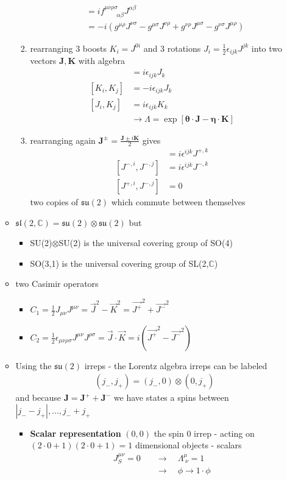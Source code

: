 \documentclass[10pt,a4paper]{report}
\theoremstyle{definition}
\begin{document}
\begin{itemize}
\begin{itemize}
\begin{enumerate}
\begin{align}
&=if^{\mu\nu\rho\sigma}_{\qquad\alpha\beta}J^{\alpha\beta}\\
&=-i(g^{\mu\rho}J^{\nu\sigma}-g^{\mu\sigma}J^{\nu\rho}+g^{\nu\rho}J^{\mu\sigma}-g^{\nu\sigma}J^{\mu\rho})
\end{align}
\item rearranging 3 boosts $K_i=J^{0i}$ and 3 rotations $J_i=\frac{1}{2}\epsilon_{ijk}J^{jk}$ into two vectors $\mathbf{J,K}$ with algebra
\begin{align}
[J_i,J_j]&=i\epsilon_{ijk}J_k\\
[K_i,K_j]&=-i\epsilon_{ijk}J_k\\
[J_i,K_j]&=i\epsilon_{ijk}K_k\\
&\rightarrow\Lambda=\exp\left[\pmb{\theta}\cdot\mathbf{J}-\pmb{\eta}\cdot\mathbf{K}\right]
\end{align}
\item rearranging again $\mathbf{J}^\pm=\frac{\mathbf{J}\pm i\mathbf{K}}{2}$ gives
\begin{align}
[J^{+,i},J^{+,j}]&=i\epsilon^{ijk}J^{+,k}\\
[J^{-,i},J^{-,j}]&=i\epsilon^{ijk}J^{-,k}\\
[J^{+,i},J^{-,j}]&=0
\end{align}
two copies of $\mathfrak{su}(2)$ which commute between themselves
\end{enumerate}
\item $\mathfrak{sl}(2,\mathbb{C})=\mathfrak{su}(2)\otimes\mathfrak{su}(2)$ but 
\begin{itemize}
\item SU(2)$\otimes$SU(2) is the universal covering group of SO(4)
\item SO(3,1) is the universal covering group of SL(2,$\mathbb{C}$)
\end{itemize}
\item two Casimir operators
\begin{itemize}
\item $C_1=\frac{1}{2}J_{\mu\nu}J^{\mu\nu}=\vec{J}^2-\vec{K}^2=\vec{J^+}^2+\vec{J^-}^2$
\item $C_2=\frac{1}{2}\epsilon_{\mu\nu\rho\sigma}J^{\mu\nu}J^{\rho\sigma}=\vec{J}\cdot\vec{K}=i(\vec{J^+}^2-\vec{J^-}^2)$
\end{itemize} 
\item Using the $\mathfrak{su}(2)$ irreps - the Lorentz algebra irreps can be labeled 
\begin{align}
(j_-,j_+)=(j_-,0)\otimes(0,j_+)
\end{align}
and because $\mathbf{J}=\mathbf{J}^+ + \mathbf{J}^-$ we have states a spins between $|j_--j_+|,...,j_-+j_+$
\begin{itemize}
\item {\bf Scalar representation} $(0,0)$ the spin $0$ irrep - acting on $(2\cdot0+1)(2\cdot0+1)=1$ dimensional objects - scalars
\begin{align}
J_S^{\mu\nu}=0
&\quad\rightarrow\quad\Lambda^\mu_{\;\nu}=1\\
&\quad\rightarrow\quad\phi\rightarrow1\cdot\phi
\end{align}


\end{itemize}
\end{itemize}
\end{itemize}
\end{document}

